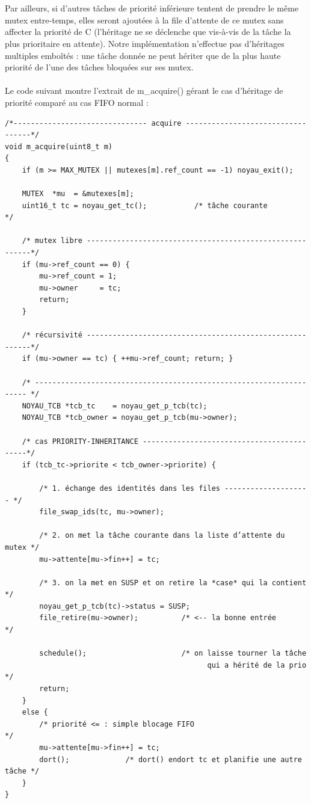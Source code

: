 \documentclass{latexPackage/utc-report/utc-report}
\begin{document}
\\\\
Par ailleurs, si d’autres tâches de priorité inférieure tentent de prendre le même mutex entre-temps, elles seront ajoutées à la file d’attente de ce mutex sans affecter la priorité de C (l’héritage ne se déclenche que vis-à-vis de la tâche la plus prioritaire en attente). Notre implémentation n’effectue pas d’héritages multiples emboîtés : une tâche donnée ne peut hériter que de la plus haute priorité de l’une des tâches bloquées sur ses mutex.
\\\\
Le code suivant montre l’extrait de m\_acquire() gérant le cas d’héritage de priorité comparé au cas FIFO normal :

\begin{verbatim}
/*------------------------------- acquire ----------------------------------*/
void m_acquire(uint8_t m)
{
    if (m >= MAX_MUTEX || mutexes[m].ref_count == -1) noyau_exit();

    MUTEX  *mu  = &mutexes[m];
    uint16_t tc = noyau_get_tc();           /* tâche courante              */

    /* mutex libre ---------------------------------------------------------*/
    if (mu->ref_count == 0) {
        mu->ref_count = 1;
        mu->owner     = tc;
        return;
    }

    /* récursivité ---------------------------------------------------------*/
    if (mu->owner == tc) { ++mu->ref_count; return; }

    /* -------------------------------------------------------------------- */
    NOYAU_TCB *tcb_tc    = noyau_get_p_tcb(tc);
    NOYAU_TCB *tcb_owner = noyau_get_p_tcb(mu->owner);

    /* cas PRIORITY-INHERITANCE -------------------------------------------*/
    if (tcb_tc->priorite < tcb_owner->priorite) {

        /* 1. échange des identités dans les files -------------------- */
        file_swap_ids(tc, mu->owner);

        /* 2. on met la tâche courante dans la liste d’attente du mutex */
        mu->attente[mu->fin++] = tc;

        /* 3. on la met en SUSP et on retire la *case* qui la contient  */
        noyau_get_p_tcb(tc)->status = SUSP;
        file_retire(mu->owner);          /* <-- la bonne entrée          */

        schedule();                      /* on laisse tourner la tâche
                                               qui a hérité de la prio       */
        return;
    }
    else {
        /* priorité <= : simple blocage FIFO                                 */
        mu->attente[mu->fin++] = tc;
        dort();             /* dort() endort tc et planifie une autre tâche */
    }
}
\end{verbatim}
\end{document}
